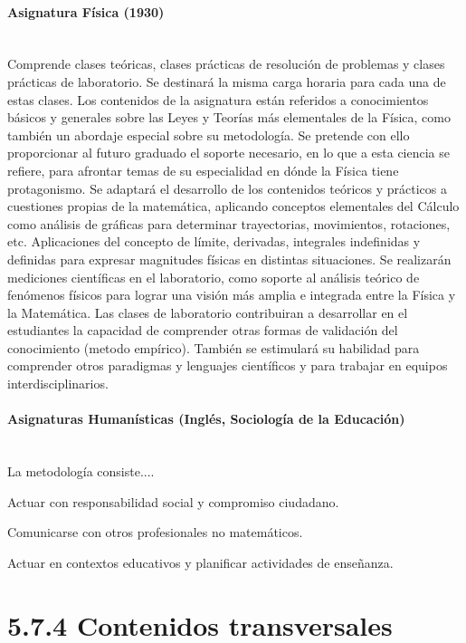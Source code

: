 \documentclass[a4paper, 12pt]{article}
\begin{document}
\paragraph{Asignatura Física (1930)}\mbox{}\\

Comprende clases teóricas, clases prácticas  de resolución de problemas y clases prácticas de laboratorio. Se destinará la misma carga horaria  para cada una de estas clases. Los contenidos de la asignatura están referidos a conocimientos básicos y generales sobre las Leyes y Teorías más elementales de la Física, como también un abordaje especial sobre su metodología. Se pretende con ello proporcionar al futuro graduado el soporte necesario, en lo que a esta ciencia se refiere, para afrontar temas de su especialidad en dónde la Física tiene protagonismo. Se adaptará el desarrollo de los contenidos teóricos y prácticos a cuestiones propias de la matemática, aplicando conceptos elementales del Cálculo como análisis de gráficas para determinar trayectorias, movimientos, rotaciones, etc. Aplicaciones del concepto de límite, derivadas, integrales indefinidas y definidas para expresar magnitudes físicas en distintas situaciones. Se realizarán  mediciones científicas en el laboratorio, como soporte al análisis teórico de fenómenos físicos para lograr una visión más amplia e integrada entre la Física y la Matemática.   Las clases de laboratorio contribuiran a desarrollar en el estudiantes la capacidad de  comprender otras formas de validación del conocimiento (metodo empírico). También se estimulará su habilidad para comprender otros paradigmas y lenguajes científicos y para trabajar en equipos interdisciplinarios.
 


\paragraph{Asignaturas Humanísticas (Inglés, Sociología de la Educación)}\mbox{}\\

La metodología consiste....
 
Actuar con responsabilidad social y compromiso ciudadano.

 Comunicarse con otros profesionales no matemáticos.

Actuar en contextos educativos y planificar actividades de enseñanza.


\section*{5.7.4 Contenidos transversales}
\end{document}
